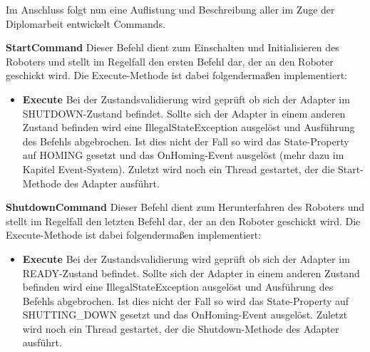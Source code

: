 Im Anschluss folgt nun eine Auflistung und Beschreibung aller im Zuge der Diplomarbeit entwickelt Commands.

\textbf{StartCommand}
\newline
Dieser Befehl dient zum Einschalten und Initialisieren des Roboters und stellt im Regelfall den ersten Befehl dar, der an den Roboter geschickt wird. Die Execute-Methode ist dabei folgendermaßen implementiert:
\begin{itemize}
\item \textbf{Execute}
\newline
Bei der Zustandsvalidierung wird geprüft ob sich der Adapter im SHUTDOWN-Zustand befindet. Sollte sich der Adapter in einem anderen Zustand befinden wird eine IllegalStateException ausgelöst und Ausführung des Befehls abgebrochen. Ist dies nicht der Fall so wird das State-Property auf HOMING gesetzt und das OnHoming-Event ausgelöst (mehr dazu im Kapitel Event-System). Zuletzt wird noch ein Thread gestartet, der die Start-Methode des Adapter ausführt.
\end{itemize}

\textbf{ShutdownCommand}
\newline
Dieser Befehl dient zum Herunterfahren des Roboters und stellt im Regelfall den letzten Befehl dar, der an den Roboter geschickt wird. Die Execute-Methode ist dabei folgendermaßen implementiert:
\begin{itemize}
\item \textbf{Execute}
\newline
Bei der Zustandsvalidierung wird geprüft ob sich der Adapter im READY-Zustand befindet. Sollte sich der Adapter in einem anderen Zustand befinden wird eine IllegalStateException ausgelöst und Ausführung des Befehls abgebrochen. Ist dies nicht der Fall so wird das State-Property auf SHUTTING\_DOWN gesetzt und das OnHoming-Event ausgelöst. Zuletzt wird noch ein Thread gestartet, der die Shutdown-Methode des Adapter ausführt.
\end{itemize}

